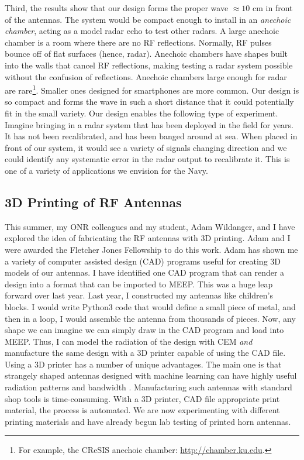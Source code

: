 \documentclass[../../../main.tex]{subfiles}
\begin{document}
Third, the results show that our design forms the proper wave $\approx 10$ cm in front of the antennas.  The system would be compact enough to install in an \textit{anechoic chamber}, acting as a model radar echo to test other radars.  A large anechoic chamber is a room where there are no RF reflections.  Normally, RF pulses bounce off of flat surfaces (hence, radar).  Anechoic chambers have shapes built into the walls that cancel RF reflections, making testing a radar system possible without the confusion of reflections.  Anechoic chambers large enough for radar are rare\footnote{For example, the CReSIS anechoic chamber: \url{http://chamber.ku.edu}.}.  Smaller ones designed for smartphones are more common.  Our design is so compact and forms the wave in such a short distance that it could potentially fit in the small variety.  Our design enables the following type of experiment. Imagine bringing in a radar system that has been deployed in the field for years.  It has not been recalibrated, and has been banged around at sea.  When placed in front of our system, it would see a variety of signals changing direction and we could identify any systematic error in the radar output to recalibrate it.  This is one of a variety of applications we envision for the Navy.

\subsection{3D Printing of RF Antennas}
\label{sec:3d_printer}

This summer, my ONR colleagues and my student, Adam Wildanger, and I have explored the idea of fabricating the RF antennas with 3D printing.  Adam and I were awarded the Fletcher Jones Fellowship to do this work.  Adam has shown me a variety of computer assisted design (CAD) programs useful for creating 3D models of our antennas.  I have identified one CAD program that can render a design into a format that can be imported to MEEP.  This was a huge leap forward over last year.  Last year, I constructed my antennas like children's blocks.  I would write Python3 code that would define a small piece of metal, and then in a loop, I would assemble the antenna from thousands of pieces.  Now, any shape we can imagine we can simply draw in the CAD program and load into MEEP.  Thus, I can model the radiation of the design with CEM \textit{and} manufacture the same design with a 3D printer capable of using the CAD file.  Using a 3D printer has a number of unique advantages.  The main one is that strangely shaped antennas designed with machine learning can have highly useful radiation patterns and bandwidth \cite{10.3390/electronics10121377} \cite{10.1109/access.2019.2932912}.  Manufacturing such antennas with standard shop tools is time-consuming.  With a 3D printer, CAD file appropriate print material, the process is automated.  We are now experimenting with different printing materials and have already begun lab testing of printed horn antennas.
\end{document}

